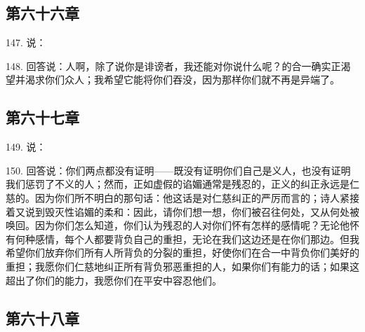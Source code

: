 
\subsection{第六十六章}

147. 说：\par

148. 回答说：人啊，除了说你是诽谤者，我还能对你说什么呢？的合一确实正渴望并渴求你们众人；我希望它能将你们吞没，因为那样你们就不再是异端了。\par


\subsection{第六十七章}

149. 说：\par

150. 回答说：你们两点都没有证明——既没有证明你们自己是义人，也没有证明我们惩罚了不义的人；然而，正如虚假的谄媚通常是残忍的，正义的纠正永远是仁慈的。因为你们所不明白的那句话：他这话是对仁慈纠正的严厉而言的；诗人紧接着又说到毁灭性谄媚的柔和：因此，请你们想一想，你们被召往何处，又从何处被唤回。因为你们怎么知道，你们认为残忍的人对你们怀有怎样的感情呢？无论他怀有何种感情，每个人都要背负自己的重担，无论在我们这边还是在你们那边。但我希望你们放弃你们所有人所背负的分裂的重担，好使你们在合一中背负你们美好的重担；我愿你们仁慈地纠正所有背负邪恶重担的人，如果你们有能力的话；如果这超出了你们的能力，我愿你们在平安中容忍他们。\par


\subsection{第六十八章}

